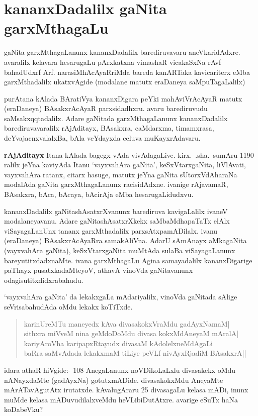 \chapter{kananxDadalilx gaNita garxMthagaLu}

\vskip -20pt
gaNita garxMthagaLanunx kananxDadalilx barediruvavaru aneVkaridAdxre. avaralilx kelavara hesaru\-gaLu pArxkatxna vimashaR vicakaSxNa rAvf bahadUdxrf Arf. narasiMhAcAyaRriMda bareda kanARTaka kavicariterx eMba garxMthadalilx ukatxvAgide (modalane matutx eraDaneya saMpuTagaLalilx)

purAtana kAlada BAratiVya kananxDigara peYki mahAviVrAcAyaR matutx (eraDaneya) BAsakxrAcAyaR parxsidadhxru. avaru barediruvudu saMsakxqqtadalilx. Adare gaNitada garxMthagaLanunx kananxDadalilx barediruvavaralilx rAjAditayx, BAsakxra, caMdarxma, timamxrasa, deYvajacnxvalalxBa, bAla veYdayxda celuva muKayxrAdavaru.

\textbf{rAjAditayx} Itana kAlada bagegx vAda vivAdagaLive. kirx.~.sha.~sumAru {\rm 1190} ralilx jeYna kaviyAda Itanu `vayxvahAra gaNita', keSxVtarxgaNita, liVlAvati, vayxvahAra ratanx, citarx hasuge, matutx jeYna gaNita sUtorxVdAharaNa modalAda gaNita garxMthagaLanunx racisidAdxne. ivanige rAjavamaR, BAsakxra, bAca, bAcaya, bAcirAja eMba hesarugaLidudxvu.

kananxDadalilx gaNitashAsatxrXvanunx barediruva kavigaLalilx ivaneV modalaneyavanu. Adare gaNitashAsatxrXkekx saMbaMdhapaTaTx elAlx viSayagaLanUnx tananx garxMthadalilx parxsAtxpamADilalx. ivanu (eraDaneya) BAsakxrAcAyaRra samakAliVna. AdarU sAmAnayx aMkagaNita (vayxvahAra gaNita), keSxVtarxgaNita muMtAda sulaBa viSayagaLanunx bareyutitxdadxnaMte. ivana garxMthagaLu Agina samayadalilx kananxDigarige paThayx pusatxkadaMteyoV, athavA vinoVda gaNitavanunx odagisutitxdidxrabahudu.

`vayxvahAra gaNita' da lekakxgaLa mAdariyalilx, vinoVda gaNitada sAlige seVrisa\-bahudAda oMdu lekakx koTiTxde.

\newpage

\begin{verse}
karinUreMTu maneyedx kAva divasakokxVraMdu gadAyxNamaM|\\
sithxra miVveM nina geMdoDoMdu divasa kokxMdAneyaM mAralA|\\
kariyAroVha karipapxRtayudx divasaM kAdolelxneMdAgaLi\\
baRra saMvAdada lekakxmaM tiLiye peVLf nivAyxRjadiM BAsakxrA||
\end{verse}

idara athaR hiVgide:- {\rm 108} AnegaLanunx noVDikoLaLxlu divasakekx oMdu nANayx\-daMte (gadAyxNa) gotutxmADide. divasakokxMdu AneyaMte mArATavAgutAtx irutatxde. kAvalugAraru {\rm 25} divasagaLu kelasa mADi, inunx muMde kelasa mADu\-vudilalxveMdu heVLibiDutAtxre. avarige eSuTx haNa koDabeVku?

